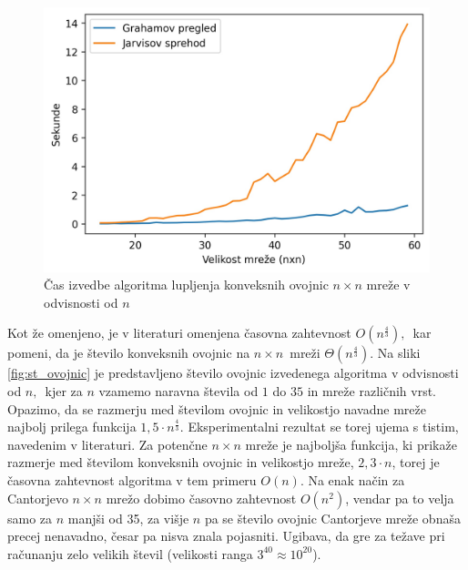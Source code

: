 \documentclass[a4paper]{article}
\begin{document}
\begin{figure}[!h]
	\centering
	\caption{Čas izvedbe algoritma lupljenja konveksnih ovojnic $n \times n$ mreže v odvisnosti od $n$}
	\label{fig:cas}
	\includegraphics[scale=0.6]{slike/cas.jpg}
\end{figure}

Kot že omenjeno, je v literaturi omenjena časovna zahtevnost $O(n ^ \frac{4}{3}),$~kar pomeni, da je število konveksnih ovojnic na $n \times n$~mreži $\Theta(n ^ \frac{4}{3})$.
Na sliki \ref{fig:st_ovojnic} je predstavljeno število ovojnic izvedenega algoritma v odvisnosti od $n,$~kjer za $n$ vzamemo naravna števila od $1$ do $35$ in mreže različnih vrst. 
Opazimo, da se razmerju med številom ovojnic in velikostjo navadne mreže najbolj prilega funkcija $1,5 \cdot n ^ \frac{4}{3}.$ Eksperimentalni rezultat se torej ujema s tistim, navedenim v 
literaturi. Za potenčne $n \times n$ mreže je najboljša funkcija, ki prikaže razmerje med številom konveksnih ovojnic in velikostjo mreže, $2,3 \cdot n$, torej je časovna zahtevnost algoritma
v tem primeru $O(n)$. Na enak način za Cantorjevo $n \times n$ mrežo dobimo časovno zahtevnost $O(n^2)$, vendar pa to velja samo za $n$ manjši od 35, za višje $n$ pa se
število ovojnic Cantorjeve mreže obnaša precej nenavadno, česar pa nisva znala pojasniti. Ugibava, da gre za težave pri računanju zelo velikih števil (velikosti ranga $3^{40} \approx 10^{20}$).
\end{document}
